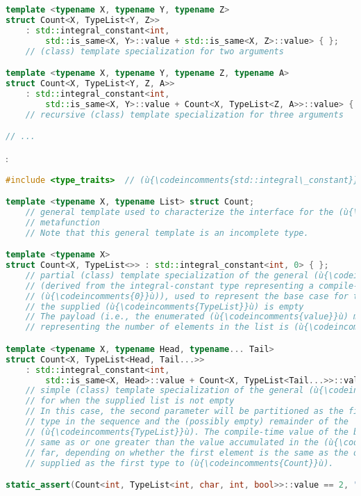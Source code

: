 {{\begin{lstlisting}[language=C++, basicstyle={\ttfamily\footnotesize}]
template <typename X, typename Y, typename Z>
struct Count<X, TypeList<Y, Z>>
    : std::integral_constant<int,
        std::is_same<X, Y>::value + std::is_same<X, Z>::value> { };
    // (class) template specialization for two arguments

template <typename X, typename Y, typename Z, typename A>
struct Count<X, TypeList<Y, Z, A>>
    : std::integral_constant<int,
        std::is_same<X, Y>::value + Count<X, TypeList<Z, A>>::value> { };
    // recursive (class) template specialization for three arguments

// ...
\end{lstlisting}
      }}:

\begin{lstlisting}[language=C++,label={relaxedconstexpr-countcode}]
#include <type_traits>  // (ù{\codeincomments{std::integral\_constant}}ù), (ù{\codeincomments{std::is\_same}}ù)

template <typename X, typename List> struct Count;
    // general template used to characterize the interface for the (ù{\codeincomments{Count}}ù)
    // metafunction
    // Note that this general template is an incomplete type.

template <typename X>
struct Count<X, TypeList<>> : std::integral_constant<int, 0> { };
    // partial (class) template specialization of the general (ù{\codeincomments{Count}}ù) template
    // (derived from the integral-constant type representing a compile-time
    // (ù{\codeincomments{0}}ù)), used to represent the base case for the recursion --- i.e., when
    // the supplied (ù{\codeincomments{TypeList}}ù) is empty
    // The payload (i.e., the enumerated (ù{\codeincomments{value}}ù) member of the base class)
    // representing the number of elements in the list is (ù{\codeincomments{0}}ù).

template <typename X, typename Head, typename... Tail>
struct Count<X, TypeList<Head, Tail...>>
    : std::integral_constant<int,
        std::is_same<X, Head>::value + Count<X, TypeList<Tail...>>::value> { };
    // simple (class) template specialization of the general (ù{\codeincomments{count}}ù) template
    // for when the supplied list is not empty
    // In this case, the second parameter will be partitioned as the first
    // type in the sequence and the (possibly empty) remainder of the
    // (ù{\codeincomments{TypeList}}ù). The compile-time value of the base class will be either the
    // same as or one greater than the value accumulated in the (ù{\codeincomments{TypeList}}ù) so
    // far, depending on whether the first element is the same as the one
    // supplied as the first type to (ù{\codeincomments{Count}}ù).

static_assert(Count<int, TypeList<int, char, int, bool>>::value == 2, "");
\end{lstlisting}

